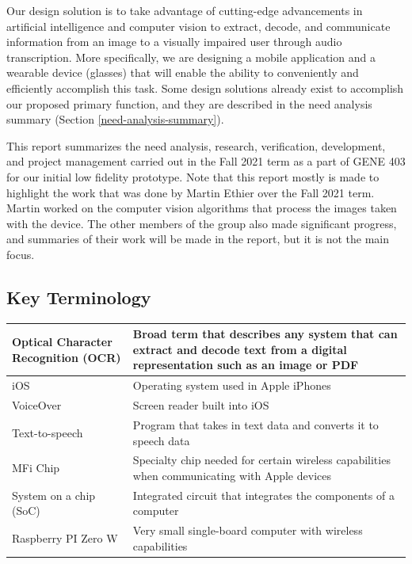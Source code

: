 \documentclass[a4paper,11pt]{article}
\begin{document}
Our design solution is to take advantage of cutting-edge advancements in artificial intelligence and computer vision to extract, decode, and communicate information from an image to a visually impaired user through audio transcription. More specifically, we are designing a mobile application and a wearable device (glasses) that will enable the ability to conveniently and efficiently accomplish this task. Some design solutions already exist to accomplish our proposed primary function, and they are described in the need analysis summary (Section \ref{need-analysis-summary}).

This report summarizes the need analysis, research, verification, development, and project management carried out in the Fall 2021 term as a part of GENE 403 for our initial low fidelity prototype. Note that this report mostly is made to highlight the work that was done by Martin Ethier over the Fall 2021 term. Martin worked on the computer vision algorithms that process the images taken with the device. The other members of the group also made significant progress, and summaries of their work will be made in the report, but it is not the main focus.

\newpage
\subsection{Key Terminology}

\setlength{\tabcolsep}{1em}
\begin{table}[ht]
    \centering
    \begin{tabular}{|p{5cm}|p{10cm}|}
        \hline
        Optical Character Recognition (OCR) & Broad term that describes any system that can extract and decode text from a digital representation such as an image or PDF \\ \hline
        iOS & Operating system used in Apple iPhones \\ \hline
        VoiceOver & Screen reader built into iOS \\ \hline
        Text-to-speech & Program that takes in text data and converts it to speech data \\ \hline
        MFi Chip & Specialty chip needed for certain wireless capabilities when communicating with Apple devices \\ \hline
        System on a chip (SoC) & Integrated circuit that integrates the components of a computer \\ \hline
        Raspberry PI Zero W & Very small single-board computer with wireless capabilities \\ \hline
    \end{tabular}
\end{table}
\end{document}
